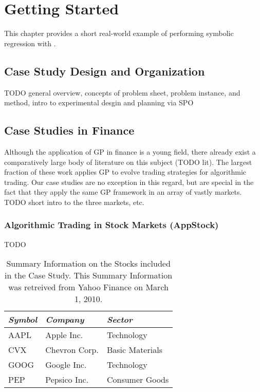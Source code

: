 
\chapter{Getting Started}
This chapter provides a short real-world example of performing symbolic regression with \RGP.
\lipsum[1]


\section{Case Study Design and Organization}
TODO general overview, concepts of problem sheet, problem instance, and method, intro to
experimental desgin and planning via SPO

\lipsum[2]


\section{Case Studies in Finance}
Although the application of GP in finance is a young field, there already exist a comparatively
large body of literature on this subject (TODO lit). The largest fraction of these work applies GP
to evolve trading strategies for algorithmic trading. Our case studies are no exception in this
regard, but are special in the fact that they apply the same GP framework in an array of vastly
markets. TODO short intro to the three markets, etc.

\subsection{Algorithmic Trading in Stock Markets {\sf (AppStock)}}
TODO

\begin{table}[ht]
  \caption{Summary Information on the Stocks included in the Case Study. This Summary Information was retreived from Yahoo Finance on March 1, 2010.}
  \begin{tabular}{lll}
    \toprule
    {\em Symbol} & {\em Company} & {\em Sector}    \\
    \midrule
    {\sf AAPL}   & Apple Inc.    & Technology      \\
    {\sf CVX}    & Chevron Corp. & Basic Materials \\
    {\sf GOOG}   & Google Inc.   & Technology      \\
    {\sf PEP}    & Pepsico Inc.  & Consumer Goods  \\
    \bottomrule
  \end{tabular}
\end{table}

